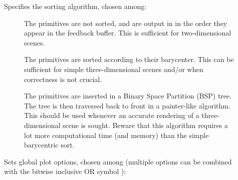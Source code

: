 \begin{description}
\item[] Specifies the sorting algorithm, chosen among:

\begin{description}
\item[] The primitives are not sorted, and are output in
   in the order they appear in the feedback buffer. This is
  sufficient for two-dimensional scenes.
\item[] The primitives are sorted according to their
  barycenter. This can be sufficient for simple three-dimensional scenes
  and/or when correctness is not crucial.
\item[] The primitives are inserted in a Binary Space
  Partition (BSP) tree. The tree is then traversed back to front in a
  painter-like algorithm. This should be used whenever an accurate rendering
  of a three-dimensional scene is sought. Beware that this algorithm
  requires a lot more computational time (and memory) than the simple
  barycentric sort.
\end{description}

\item[] Sets global plot options, chosen among (multiple options
  can be combined with the bitwise inclusive OR symbol \dd{|}):


\end{description}
